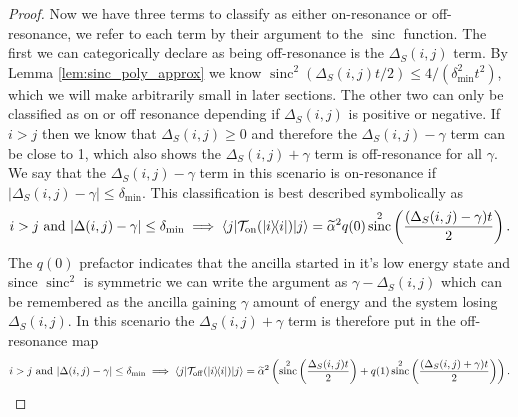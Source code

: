 \documentclass{article}
\newcommand{\on}{\rm on}
\newcommand{\off}{\rm off}
\newcommand{\ket}[1]{|#1\rangle}
\newcommand{\bra}[1]{\langle #1|}
\newcommand{\ketbra}[2]{| #1\rangle\! \langle #2|}
\DeclareMathOperator{\sinc}{sinc}
\begin{document}
\begin{proof}
    Now we have three terms to classify as either on-resonance or off-resonance, we refer to each term by their argument to the $\sinc$ function. The first we can categorically declare as being off-resonance is the $\Delta_S(i,j)$ term. By Lemma \ref{lem:sinc_poly_approx} we know $\sinc^2(\Delta_S(i,j) t/ 2) \le 4 / (\delta_{\min}^2 t^2)$, which we will make arbitrarily small in later sections. The other two can only be classified as on or off resonance depending if $\Delta_S(i,j)$ is positive or negative. If $i > j$ then we know that $\Delta_S(i,j) \ge 0$ and therefore the $\Delta_S(i,j) - \gamma$ term can be close to 1, which also shows the $\Delta_S(i,j) + \gamma$ term is off-resonance for all $\gamma$. We say that the $\Delta_S(i,j) - \gamma$ term in this scenario is on-resonance if $|\Delta_S(i,j) - \gamma| \le \delta_{\min}$. This classification is best described symbolically as
    \begin{equation}
    i > j \text{ and } |\Delta(i,j) - \gamma| \le \delta_{\min} \implies  \bra{j} \mathcal{T}_{\on}(\ketbra{i}{i}) \ket{j} = \widetilde{\alpha}^2 q(0) \sinc^2 \left( \frac{(\Delta_S(i,j) - \gamma)t}{2} \right).\label{eq:on_resonance_i_geq_j}
    \end{equation}
    The $q(0)$ prefactor indicates that the ancilla started in it's low energy state and since $\sinc^2$ is symmetric we can write the argument as $\gamma - \Delta_S(i,j)$ which can be remembered as the ancilla gaining $\gamma$ amount of energy and the system losing $\Delta_S(i,j)$. In this scenario the $\Delta_S(i,j) + \gamma$ term is therefore put in the off-resonance map
    \begin{align}
        i > j \text{ and } |\Delta(i,j) - \gamma| \le \delta_{\min} \implies  \bra{j} \mathcal{T}_{\off}(\ketbra{i}{i}) \ket{j} = \widetilde{\alpha}^2\left( \sinc^2 \left( \frac{\Delta_S(i,j) t}{2} \right) + q(1) \sinc^2 \left(\frac{(\Delta_S(i,j) + \gamma) t}{2} \right) \right).
    \end{align}
    

\end{proof}
\end{document}
